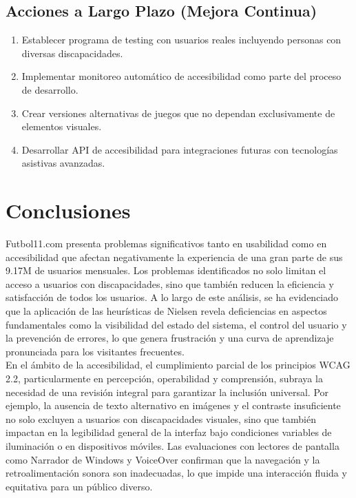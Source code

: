 \documentclass{article}
\begin{document}
	\subsection{Acciones a Largo Plazo (Mejora Continua)}
	\noindent
	\begin{enumerate}
		\item Establecer programa de testing con usuarios reales incluyendo personas con diversas discapacidades.
		\item Implementar monitoreo automático de accesibilidad como parte del proceso de desarrollo.
		\item Crear versiones alternativas de juegos que no dependan exclusivamente de elementos visuales.
		\item Desarrollar API de accesibilidad para integraciones futuras con tecnologías asistivas avanzadas.
	\end{enumerate}
\newpage
	\section{Conclusiones}

	\noindent
	Futbol11.com presenta problemas significativos tanto en usabilidad como en accesibilidad que afectan negativamente la experiencia de una gran parte de sus 9.17M de usuarios mensuales. Los problemas identificados no solo limitan el acceso a usuarios con discapacidades, sino que también reducen la eficiencia y satisfacción de todos los usuarios. A lo largo de este análisis, se ha evidenciado que la aplicación de las heurísticas de Nielsen revela deficiencias en aspectos fundamentales como la visibilidad del estado del sistema, el control del usuario y la prevención de errores, lo que genera frustración y una curva de aprendizaje pronunciada para los visitantes frecuentes. \\

	\noindent
	En el ámbito de la accesibilidad, el cumplimiento parcial de los principios WCAG 2.2, particularmente en percepción, operabilidad y comprensión, subraya la necesidad de una revisión integral para garantizar la inclusión universal. Por ejemplo, la ausencia de texto alternativo en imágenes y el contraste insuficiente no solo excluyen a usuarios con discapacidades visuales, sino que también impactan en la legibilidad general de la interfaz bajo condiciones variables de iluminación o en dispositivos móviles. Las evaluaciones con lectores de pantalla como Narrador de Windows y VoiceOver confirman que la navegación y la retroalimentación sonora son inadecuadas, lo que impide una interacción fluida y equitativa para un público diverso. \\
\end{document}
